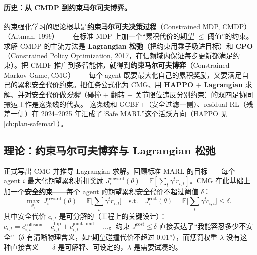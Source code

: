 \paragraph{历史：从 CMDP 到约束马尔可夫博弈。}
约束强化学习的理论根基是\textbf{约束马尔可夫决策过程}（Constrained MDP, CMDP）\cite{altman1999cmdp}（Altman, 1999）——在标准 MDP 上加一个“累积代价的期望 $\le$ 阈值”的约束。求解 CMDP 的主流方法是 \textbf{Lagrangian 松弛}（把约束用乘子吸进目标）和 \textbf{CPO}（Constrained Policy Optimization, 2017\cite{achiam2017constrained}，在信赖域内保证每步更新都满足约束）。把 CMDP 推广到多智能体，就得到\textbf{约束马尔可夫博弈}（Constrained Markov Game, CMG）——每个 agent 既要最大化自己的累积奖励，又要满足自己的累积安全代价约束。把任务公式化为 CMG、用 \textbf{HAPPO $+$ Lagrangian} 求解、并对安全代价做\emph{分解}（碰撞 $+$ 翻转 $+$ 关节限位违反分别约束）的双四足协同搬运工作是这条线的代表。%
这条线和 GCBF+（安全过滤一侧）、residual RL（残差一侧）在 2024--2025 年汇成了“Safe MARL”这个活跃方向（HAPPO 见 \cref{ch:plan-safemarl}\cite{kuba2022happo}）。

\subsection{理论：约束马尔可夫博弈与 Lagrangian 松弛}
\label{sec:mh-cmg}

正式写出 CMG 并推导 Lagrangian 求解。回顾标准 MARL 的目标——每个 agent $i$ 最大化期望累积折扣奖励 $J_i^{\text{reward}}(\theta)=\mathbb{E}[\sum_t\gamma^tr_{i,t}]$。CMG 在此基础上加一个\textbf{安全约束}——每个 agent 的期望累积安全代价不超过阈值 $\delta$：
\begin{equation}
  \max_{\theta_i}\ J_i^{\text{reward}}(\theta)=\mathbb{E}\Big[\textstyle\sum_t\gamma^tr_{i,t}\Big]\quad\text{s.t.}\quad J_i^{\text{cost}}(\theta)=\mathbb{E}\Big[\textstyle\sum_t\gamma^tc_{i,t}\Big]\le\delta,
  \label{eq:mh-cmg}
\end{equation}
其中安全代价 $c_{i,t}$ 是可分解的（工程上的关键设计）：$c_{i,t}=c_{i,t}^{\text{collision}}+c_{i,t}^{\text{flip}}+c_{i,t}^{\text{joint-limit}}+\dots$。约束 $J^{\text{cost}}\le\delta$ 直接表达了“我能容忍多少不安全”（$\delta$ 有清晰物理含义，如“期望碰撞代价不超过 $0.01$”），而惩罚权重 $\lambda$ 没有这种直接含义——$\delta$ 是可解释、可设定的，$\lambda$ 是需要试凑的。

